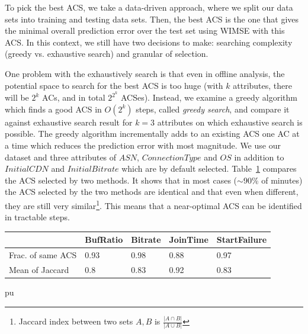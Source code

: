 To pick the best ACS, we take a data-driven approach, where we split our data sets into training and testing data sets. 
Then, the best ACS is the one that gives the minimal overall prediction error over the test set using WIMSE with this ACS. 
In this context, we still have two decisions to make: searching complexity (greedy vs. exhaustive search) and granular of selection.


 One problem with the exhaustively search is that even in offline analysis, the potential space to search for the best ACS is too huge (with $k$ attributes, there will be $2^k$ ACs, and in total $2^{2^k}$ ACSes). Instead, we examine a greedy algorithm which finds a good ACS in $O(2^k)$ steps, called {\it greedy search}, and compare it against exhaustive search result for $k=3$ attributes on which exhaustive search is possible. The greedy algorithm incrementally adds to an existing ACS one AC at a time which reduces the prediction error with most magnitude.
We use our dataset and three attributes of $ASN$, $ConnectionType$ and $OS$ in addition to $Initial CDN$ and $Initial Bitrate$ which are by default selected.
Table~\ref{tab:greedy-exhaustive} compares the ACS selected by two methods. It shows that in most cases ($\sim$90\% of minutes) the ACS selected by the two methods are identical and that even when different, they are still very similar\footnote{Jaccard index between two sets $A,B$ is $\frac{|A\cap B|}{|A\cup B|}$}. This means that a near-optimal ACS can be identified in tractable steps.

\begin{table}[t]
\begin{center}
\begin{small}
\begin{tabular}{p{2.2cm}|p{1.1cm}|p{1.1cm}|p{1.1cm}|p{1.1cm}}
		& BufRatio & Bitrate & JoinTime & StartFailure\\ \hline 
Frac. of same ACS & 0.93 & 0.98 & 0.88 & 0.97 \\
Mean of Jaccard & 0.8 & 0.83 & 0.92 & 0.83 \\
\end{tabular} pu
\end{small}
\end{center}
\label{tab:greedy-exhaustive}
\end{table}

